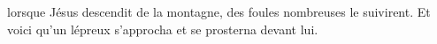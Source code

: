 \encetemps lorsque Jésus descendit de la montagne,
	des foules nombreuses le suivirent.
Et voici qu’un lépreux s’approcha et se prosterna devant lui.
